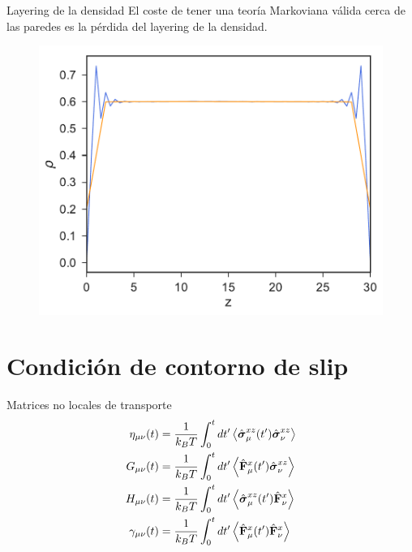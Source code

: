 \documentclass{beamer}
\begin{document}
\begin{frame}{Layering de la densidad}
  El coste de tener una teoría Markoviana válida cerca de las paredes es la pérdida del layering de la densidad. 
\begin{figure}[h!]
\includegraphics[width=0.6\linewidth]{DensityProfile-WALLS}
\end{figure}
\end{frame}



\section{Condición de contorno de slip}

\begin{frame}{Matrices no locales de transporte} 
\begin{align}
\eta_{\mu\nu}(t)
&=\frac{1}{k_BT}\int_0^t dt'
\left\langle \hat{\boldsymbol{\sigma}}^{xz}_{\mu}(t')\hat{\boldsymbol{\sigma}}^{xz}_{\nu}
\right\rangle
\nonumber\\
  G_{\mu\nu}(t)&=\frac{1}{k_BT}\int_0^t dt'
\left\langle\hat{\bf F}^x_\mu(t')
\hat{\boldsymbol{\sigma}}^{xz}_\nu
\right\rangle
\nonumber\\
H_{\mu\nu}(t)&=
\frac{1}{k_BT}\int_0^t dt'
\left\langle\hat{\boldsymbol{\sigma}}^{xz}_\mu(t')\hat{\bf F}^{x}_\nu\right\rangle
\nonumber\\
  \gamma_{\mu\nu}(t)
&=\frac{1}{k_BT}\int_0^t dt'
\left\langle 
\hat{\bf F}^{x}_\mu(t')
\hat{\bf F}^{x}_\nu\right\rangle
\nonumber
\end{align}
\end{frame}
\end{document}
